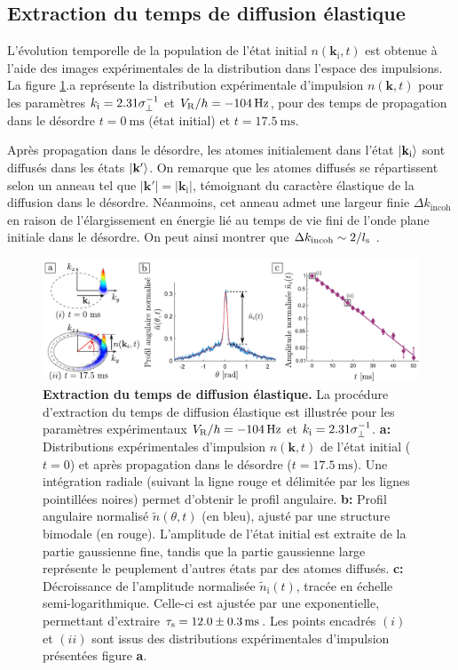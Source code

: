 \subsection{Extraction du temps de diffusion élastique}
\label{sc:traitement_donnees_extraction_taus}

L'évolution temporelle de la population de l'état initial $n(\mathbf{k}_{\mathrm{i}},t)$ est obtenue à l'aide des images expérimentales de la distribution dans l'espace des impulsions. La figure \ref{fig:extraction_taus}.a représente la distribution expérimentale d'impulsion $n(\mathbf{k},t)$ pour les paramètres $k_{\mathrm{i}}=2.31\sigma_{\perp}^{-1}$ et $V_{\mathrm{R}}/h=\SI{-104}{\hertz}$, pour des temps de propagation dans le désordre $t=\SI{0}{\milli\second}$ (état initial) et $t=\SI{17.5}{\milli\second}$. 

Après propagation dans le désordre, les atomes initialement dans l'état $\left| \mathbf{k}_{\mathrm{i}} \right\rangle$ sont diffusés dans les états $\left| \mathbf{k}' \right\rangle$. On remarque que les atomes diffusés se répartissent selon un anneau tel que $|\mathbf{k}'|=|\mathbf{k}_{\mathrm{i}}|$, témoignant du caractère élastique de la diffusion dans le désordre. Néanmoins, cet anneau admet une largeur finie $\Delta k_{\mathrm{incoh}}$ en raison de l'élargissement en énergie lié au temps de vie fini de l'onde plane initiale dans le désordre. On peut ainsi montrer que $\Delta k_{\mathrm{incoh}}\sim 2/l_{\mathrm{s}}$ \citep{cherroret2012coherent}.

\begin{figure}
\centering
\includegraphics[width=\textwidth]{Fig/TauS_PRL/extraction_taus.pdf}
\caption{\textbf{Extraction du temps de diffusion élastique.} La procédure d'extraction du temps de diffusion élastique est illustrée pour les paramètres expérimentaux $V_{\mathrm{R}}/h=\SI{-104}{\hertz}$ et $k_{\mathrm{i}}=2.31\sigma_{\perp}^{-1}$. \textbf{a:} Distributions expérimentales d'impulsion $n(\mathbf{k},t)$ de l'état initial ($t=0$) et après propagation dans le désordre ($t=\SI{17.5}{\milli\second}$). Une intégration radiale (suivant la ligne rouge et délimitée par les lignes pointillées noires) permet d'obtenir le profil angulaire. \textbf{b:} Profil angulaire normalisé $\tilde{n}(\theta,t)$ (en bleu), ajusté par une structure bimodale (en rouge). L'amplitude de l'état initial est extraite de la partie gaussienne fine, tandis que la partie gaussienne large représente le peuplement d'autres états par des atomes diffusés. \textbf{c:} Décroissance de l'amplitude normalisée $\tilde{n}_{\mathrm{i}}(t)$, tracée en échelle semi-logarithmique. Celle-ci est ajustée par une exponentielle, permettant d'extraire $\tau_{\mathrm{s}}=12.0\pm\SI{0.3}{\milli\second}$. Les points encadrés $(i)$ et $(ii)$ sont issus des distributions expérimentales d'impulsion présentées figure \textbf{a}.}
\label{fig:extraction_taus}
\end{figure}

